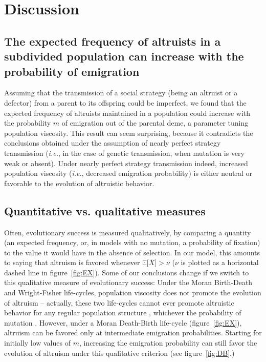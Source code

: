 \documentclass[11pt, letterpaper]{article}
\newcommand{\ie}{\textit{i.e.}}
\newcommand{\Esp}[1]{\mathbb{E}\big[ #1\big]}%
\newcommand{\mutbias}{\nu}
\begin{document}
\section*{Discussion}
\subsection*{The expected frequency of altruists in a subdivided population can increase with the probability of emigration}
Assuming that the transmission of a social strategy (being an altruist or a defector) from a parent to its offspring could be imperfect, we found that the expected frequency of altruists maintained in a population could increase with the probability $m$ of emigration out of the parental deme, a parameter tuning population viscosity. This result can seem surprising, because it contradicts the conclusions obtained under the assumption of nearly perfect strategy transmission (\ie, in the case of genetic transmission, when mutation is very weak or absent). Under nearly perfect strategy transmission indeed, increased population viscosity (\ie, decreased emigration probability) is either neutral \citep[][and dashed lines in figures~\ref{fig:EX}--]{Taylor1992islandmodel} or favorable \citep[][and dashed lines in figure~\ref{fig:EX}]{TaylorDayWild2007} to the evolution of altruistic behavior. 

\subsection*{Quantitative vs. qualitative measures}
Often, evolutionary success is measured qualitatively, by comparing a quantity (an expected frequency, or, in models with no mutation, a probability of fixation) to the value it would have in the absence of selection. In our model, this amounts to saying that altruism is favored whenever $\Esp{\overline{X}} > \mutbias$ ($\mutbias$ is plotted as a horizontal dashed line in figure~\ref{fig:EX}). 
Some of our conclusions change if we switch to this qualitative measure of evolutionary success: Under the Moran Birth-Death and Wright-Fisher life-cycles, population viscosity does not promote the evolution of altruism -- actually, these two life-cycles cannot ever promote altruistic behavior for any regular population structure \citep{Taylor2011}, whichever the probability of mutation \citep{Debarre2017}. 
However, under a Moran Death-Birth life-cycle (figure~\ref{fig:EX}), altruism can be favored only at intermediate emigration probabilities. Starting for initially low values of $m$, increasing the emigration probability can still favor the evolution of altruism under this qualitative criterion (see figure~\ref{fig:DB}.)  
\end{document}
